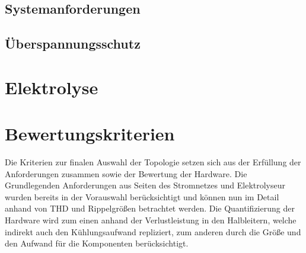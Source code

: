 \subsection{Systemanforderungen}


\subsection{Überspannungsschutz}

\section{Elektrolyse}

\section{Bewertungskriterien}
Die Kriterien zur finalen Auswahl der Topologie setzen sich aus der Erfüllung der Anforderungen zusammen sowie der Bewertung der Hardware. Die Grundlegenden Anforderungen aus Seiten des Stromnetzes und Elektrolyseur wurden bereits in der Vorauswahl berücksichtigt und können nun im Detail anhand von \gls{THD} und Rippelgrößen betrachtet werden. Die Quantifizierung der Hardware wird zum einen anhand der Verlustleistung in den Halbleitern, welche indirekt auch den Kühlungsaufwand repliziert, zum anderen durch die Größe und den Aufwand für die Komponenten berücksichtigt.  